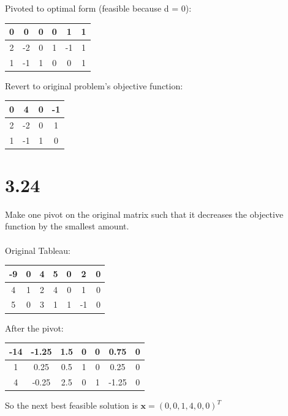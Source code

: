 \documentclass[a4paper,12pt]{article}
\begin{document}
Pivoted to optimal form (feasible because d = 0):
\begin{center}
\begin{tabular}{| c | c  c  c  c  c |}
\hline
0 & 0 & 0 & 0 & 1 & 1\\
\hline
2 & -2 & 0 & 1 & -1 & 1\\
1 & -1 & 1 & 0 & 0 & 1\\
\hline
\end{tabular}
\end{center}

Revert to original problem's objective function:
\begin{center}
\begin{tabular}{| c | c  c  c |}
\hline
0 & 4 & 0 & -1\\
\hline
2 & -2 & 0 & 1\\
1 & -1 & 1 & 0\\
\hline
\end{tabular}
\end{center}

\section*{3.24}
Make one pivot on the original matrix such that it decreases the objective function by the smallest amount.\\\\
Original Tableau:
\begin{center}
\begin{tabular}{| c | c  c  c  c  c  c |}
\hline
-9 & 0 & 4 & 5 & 0 & 2 & 0\\
\hline
4 & 1 & 2 & 4 & 0 & 1 & 0\\
5 & 0 & 3 & 1 & 1 & -1 & 0\\
\hline
\end{tabular}
\end{center}

After the pivot:
\begin{center}
\begin{tabular}{| c | c  c  c  c  c  c |}
\hline
-14 & -1.25 & 1.5 & 0 & 0 & 0.75 & 0\\
\hline
1 & 0.25 & 0.5 & 1 & 0 & 0.25 & 0\\
4 & -0.25 & 2.5 & 0 & 1 & -1.25 & 0\\
\hline
\end{tabular}
\end{center}

So the next best feasible solution is \({\mathbf x = (0, 0, 1, 4, 0, 0)^T}\)
\end{document}

